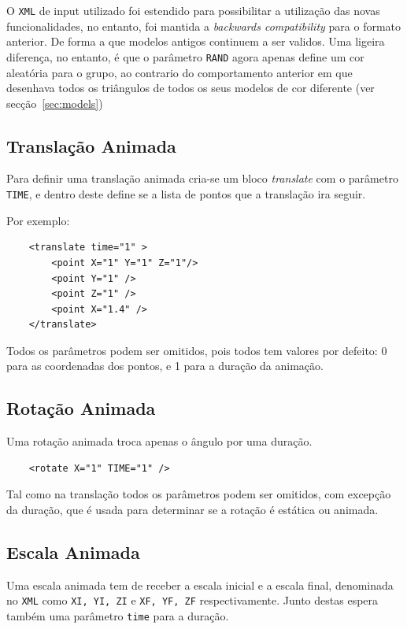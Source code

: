 \documentclass[a4paper]{article}
\begin{document}
O \texttt{XML} de input utilizado foi estendido para possibilitar a utilização das novas funcionalidades, no entanto, foi mantida a \textit{backwards compatibility} para o formato anterior. De forma a que modelos antigos continuem a ser validos. Uma ligeira diferença, no entanto, é que o parâmetro \texttt{RAND} agora apenas define um cor aleatória para o grupo, ao contrario do comportamento anterior em que desenhava todos os triângulos de todos os seus modelos de cor diferente (ver secção~\ref{sec:models})

\subsection{Translação Animada}

Para definir uma translação animada cria-se um bloco \textit{translate} com o parâmetro \texttt{TIME}, e dentro deste define se a lista de pontos que a translação ira seguir.

Por exemplo:
\begin{verbatim}
    <translate time="1" >
        <point X="1" Y="1" Z="1"/>
        <point Y="1" />
        <point Z="1" />
        <point X="1.4" />
    </translate>
\end{verbatim}

Todos os parâmetros podem ser omitidos, pois todos tem valores por defeito: 0 para as coordenadas dos pontos, e 1 para a duração da animação.

\subsection{Rotação Animada}

Uma rotação animada troca apenas o ângulo por uma duração.
\begin{verbatim}
    <rotate X="1" TIME="1" />
\end{verbatim}

Tal como na translação todos os parâmetros podem ser omitidos, com excepção da duração, que é usada para determinar se a rotação é estática ou animada.

\subsection{Escala Animada}

Uma escala animada tem de receber a escala inicial e a escala final, denominada no \texttt{XML} como \texttt{XI, YI, ZI} e \texttt{XF, YF, ZF} respectivamente. Junto destas espera também uma parâmetro \texttt{time} para a duração.
\end{document}
